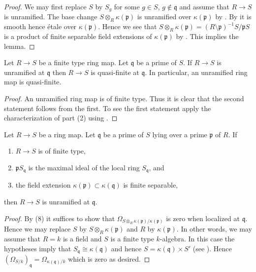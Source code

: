\begin{proof}
We may first replace $S$ by $S_g$ for some $g \in S$, $g \not \in \mathfrak q$
and assume that $R \to S$ is unramified.
The base change $S \otimes_R \kappa(\mathfrak p)$
is unramified over $\kappa(\mathfrak p)$ by
.
By
it is smooth hence \'etale over $\kappa(\mathfrak p)$.
Hence we see that
$S \otimes_R \kappa(\mathfrak p) =
(R \setminus \mathfrak p)^{-1} S/\mathfrak pS$
is a product of finite separable field extensions of
$\kappa(\mathfrak p)$ by .
This implies the lemma.
\end{proof}

\begin{lemma}
\label{lemma-unramified-quasi-finite}
Let $R \to S$ be a finite type ring map.
Let $\mathfrak q$ be a prime of $S$.
If $R \to S$ is unramified at $\mathfrak q$ then
$R \to S$ is quasi-finite at $\mathfrak q$.
In particular, an unramified ring map is quasi-finite.
\end{lemma}

\begin{proof}
An unramified ring map is of finite type.
Thus it is clear that the second statement follows from the first.
To see the first statement apply the characterization of
 part (2) using
.
\end{proof}

\begin{lemma}
\label{lemma-characterize-unramified}
Let $R \to S$ be a ring map. Let $\mathfrak q$ be a prime of $S$
lying over a prime $\mathfrak p$ of $R$. If
\begin{enumerate}
\item $R \to S$ is of finite type,
\item $\mathfrak p S_{\mathfrak q}$ is the maximal ideal
of the local ring $S_{\mathfrak q}$, and
\item the field extension $\kappa(\mathfrak p) \subset \kappa(\mathfrak q)$
is finite separable,
\end{enumerate}
then $R \to S$ is unramified at $\mathfrak q$.
\end{lemma}

\begin{proof}
By  (8) it suffices to show that
$\Omega_{S \otimes_R \kappa(\mathfrak p) / \kappa(\mathfrak p)}$
is zero when localized at $\mathfrak q$. Hence we may replace $S$
by $S \otimes_R \kappa(\mathfrak p)$ and $R$ by $\kappa(\mathfrak p)$.
In other words, we may assume that $R = k$ is a field and $S$
is a finite type $k$-algebra.
In this case the hypotheses imply that
$S_{\mathfrak q} \cong \kappa(\mathfrak q)$
and hence $S = \kappa(\mathfrak q) \times S'$ (see
).
Hence $(\Omega_{S/k})_{\mathfrak q} = \Omega_{\kappa(\mathfrak q)/k}$
which is zero as desired.
\end{proof}

